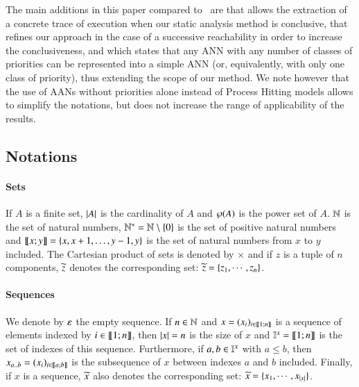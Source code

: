 The main additions in this paper compared to~\cite{FPMR13-CS2Bio} are
 that allows the extraction of a concrete trace of execution
when our static analysis method is conclusive,
 that refines our approach in the case
of a successive reachability in order to increase the conclusiveness,
and  which states that any ANN
with any number of classes of priorities
can be represented into a simple ANN
(or, equivalently, with only one class of priority),
thus extending the scope of our method.
We note however that the use of AANs without priorities alone
instead of Process Hitting models
allows to simplify the notations, but does not increase
the range of applicability of the results.



\subsection*{Notations}
\label{notations}

\paragraph*{Sets}
If $A$ is a finite set,
$|A|$ is the cardinality of $A$
and $\wp(A)$ is the power set of $A$.
$\mathbb{N}$ is the set of natural numbers,
$\mathbb{N}^* = \mathbb{N} \setminus \{ 0 \}$ is the set of positive natural numbers
and $\llbracket x; y \rrbracket = \{ x, x+1, \dots, y-1, y \}$ is the set of natural numbers from $x$ to $y$ included.
The Cartesian product of sets is denoted by $\times$ and
if $z$ is a tuple of $n$ components, $\widetilde{z}$ denotes the corresponding set:
$\widetilde{z} = \{z_1, \cdots, z_n\}$.

\paragraph*{Sequences}
We denote by $\varepsilon$ the empty sequence.
If $n \in \mathbb{N}$ and
$x = (x_i)_{i \in \llbracket 1; n \rrbracket}$ is a sequence of elements indexed by $i \in \llbracket 1; n \rrbracket$,
then $|x| = n$ is the size of $x$
and $\mathbb{I}^{x} = \llbracket 1; n \rrbracket$ is the set of indexes of this sequence.
Furthermore, if $a, b \in \mathbb{I}^{x}$ with $a \leq b$,
then $x_{a..b} = (x_i)_{i \in \llbracket a; b \rrbracket}$ is the subsequence of $x$
between indexes $a$ and $b$ included.
Finally, if $x$ is a sequence, $\widetilde{x}$ also denotes the corresponding set:
$\widetilde{x} = \{x_1, \cdots, x_{|x|}\}$.

